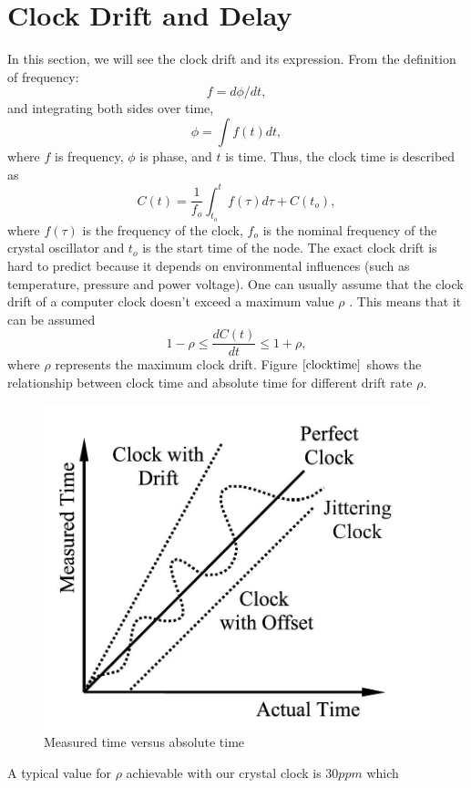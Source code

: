 \documentclass[a4paper,10pt]{report}
\begin{document}
\section{\textbf{Clock Drift and Delay}}
In this section, we will see the clock drift and its expression.
From the definition of frequency:
\begin{equation}
f = d\phi/dt \label{freq_defn} ,
\end{equation}
and integrating both sides over time,
 \begin{equation}
\phi =\int f(t)dt ,
 \end{equation}
where $f$ is frequency, $\phi$ is phase, and $t$ is time.\newline
Thus, the clock time is described as
\begin{equation}
C(t) = \frac{1}{f_o}\int_{t_o}^{t} {f(\tau)d\tau} + C(t_o) ,
\label{clock}
\end{equation}
where $f(\tau)$ is the frequency of the clock, $f_o$ is the nominal
frequency of the crystal oscillator and $t_o$ is the start time of
the node. The exact clock drift is hard to predict because it
depends on environmental influences (such as temperature, pressure
and power voltage). One can usually assume that the clock drift of a
computer clock doesn't exceed a maximum value $\rho$ . This means
that it can be assumed
\begin{equation}
1-\rho \leq \frac{dC(t)}{dt} \leq 1+\rho ,
\end{equation}
where $\rho$ represents the maximum clock drift. Figure
$\ref{clocktime}$ shows the relationship between clock time and
absolute time for different drift rate $\rho$.
\begin{figure}
\centering
\includegraphics[width=0.6 \textwidth]{actualvsmeasuredtime}
\caption{Measured time versus absolute time} \label{clocktime}
\end{figure}
\newline A typical value for $\rho$ achievable with our crystal clock is $30ppm$ which
\end{document}

